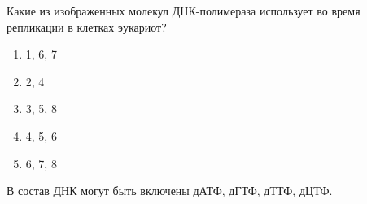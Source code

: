 
Какие из изображенных молекул ДНК-полимераза использует во время репликации в клетках эукариот?


\begin{enumerate}
    \item 1, 6, 7
    \item 2, 4
    \item 3, 5, 8
    \item 4, 5, 6
    \item 6, 7, 8
\end{enumerate}


\explanationSection

В состав ДНК могут быть включены дАТФ, дГТФ, дТТФ, дЦТФ.

